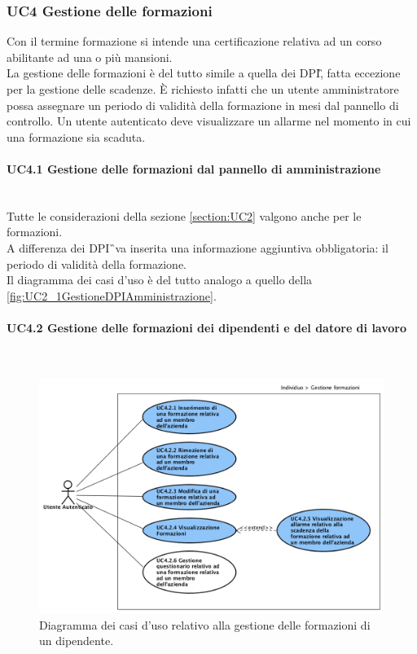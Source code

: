 	\subsubsection{UC4 Gestione delle formazioni}
		\label{section:UC4}
		Con il termine formazione si intende una certificazione relativa ad un corso abilitante ad una o più mansioni.\\
		La gestione delle formazioni è del tutto simile a quella dei \gls{DPI}\G, fatta eccezione per la gestione delle scadenze. È richiesto infatti che un utente amministratore possa assegnare un periodo di validità della formazione in mesi dal pannello di controllo. Un utente autenticato deve visualizzare un allarme nel momento in cui una formazione sia scaduta.

	\paragraph*{UC4.1 Gestione delle formazioni dal pannello di amministrazione }\mbox{} \\
		\label{section:UC4_1}
		Tutte le considerazioni della sezione \ref{section:UC2} valgono anche per le formazioni. \\
		A differenza dei \gls{DPI}\G\ va inserita una informazione aggiuntiva obbligatoria: il periodo di validità della formazione. \\
		Il diagramma dei casi d'uso è del tutto analogo a quello della  \autoref{fig:UC2_1GestioneDPIAmministrazione}.
	\paragraph*{UC4.2 Gestione delle formazioni dei dipendenti e del datore di lavoro }\mbox{} \\
		\label{section:UC4_2}
		\begin{figure}[H]
			\begin{center}
				\includegraphics[width=16cm]{Pics/UC4_2GestioneFormazioni.png}
				\caption{Diagramma dei casi d'uso relativo alla gestione delle formazioni di un dipendente.}
				\label{fig:UC4_2_Formazioni}
			\end{center}
		\end{figure}
		
